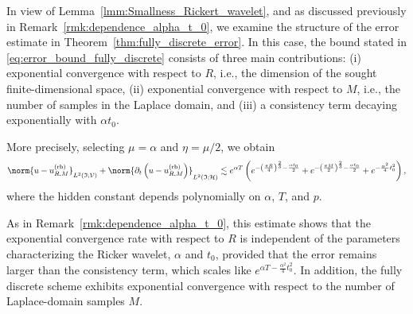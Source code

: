\begin{remark}
In view of Lemma~\ref{lmm:Smallness_Rickert_wavelet}, and as discussed previously in Remark~\ref{rmk:dependence_alpha_t_0}, we examine the structure of the error estimate in Theorem~\ref{thm:fully_discrete_error}. 
In this case, the bound stated in \eqref{eq:error_bound_fully_discrete} consists of three main contributions: 
(i) exponential convergence with respect to $R$, i.e., the dimension of the sought finite-dimensional space, 
(ii) exponential convergence with respect to $M$, i.e., the number of samples in the Laplace domain, and 
(iii) a consistency term decaying exponentially with $\alpha t_0$. 

More precisely, selecting $\mu = \alpha$ and $\eta = \mu/2$, we obtain
\begin{equation}
	\norm{
		u
		-
		u^{\normalfont\text{(rb)}}_{R,M}
	}_{L^2(\mathfrak{I};\mathcal{V})}
    +
	\norm{
		\partial_t 
		\left(
			u
			-
			u^{\normalfont\text{(rb)}}_{R,M}
		\right)
	}_{L^2(\mathfrak{I};\mathcal{H})}
    \lesssim
    e^{\alpha T}
    \left(
    e^{-\left(\frac{\pi R }{4} \right)^{\frac{2}{3}} - \frac{\alpha t_0}{2}}
    +
    e^{-\left(\frac{\pi M }{2} \right)^{\frac{2}{3}} - \frac{\alpha t_0}{2}}
    +
    e^{-\frac{\alpha^2}{4} t_0^2}
    \right),
\end{equation}
where the hidden constant depends polynomially on $\alpha$, $T$, and $p$.

As in Remark~\ref{rmk:dependence_alpha_t_0}, this estimate shows that the exponential convergence rate with respect to $R$ is independent of the parameters characterizing the Ricker wavelet, $\alpha$ and $t_0$, provided that the error remains larger than the consistency term, which scales like $e^{\alpha T - \frac{\alpha^2}{4} t_0^2}$. In addition, the fully discrete scheme exhibits exponential convergence with respect to the number of Laplace-domain samples $M$.
\end{remark}

